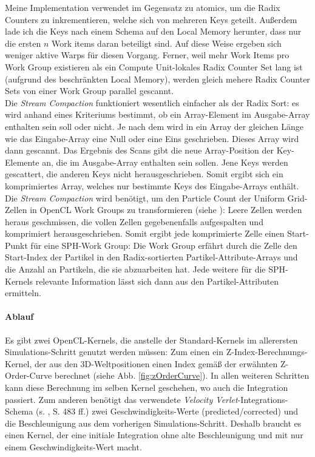 		Meine Implementation verwendet im Gegensatz zu \cite{Grand2008} atomics, um die Radix Counters
		zu inkrementieren, welche sich von mehreren Keys geteilt. Außerdem lade ich die Keys nach einem
		Schema auf den Local Memory herunter, dass nur die ersten $n$ Work items daran beteiligt sind.
		Auf diese Weise ergeben sich weniger aktive Warps für diesen Vorgang.
		Ferner, weil mehr Work Items pro Work Group existieren als ein Compute Unit-lokales
		Radix Counter Set lang ist (aufgrund des beschränkten Local Memory), werden gleich mehere
		Radix Counter Sets von einer Work Group parallel gescannt.\\
		
		
		Die \emph{Stream Compaction} funktioniert wesentlich einfacher als der Radix Sort:
		es wird anhand eines Kriteriums bestimmt, ob ein Array-Element im Ausgabe-Array enthalten sein soll oder nicht.
		Je nach dem wird in ein Array der gleichen Länge wie das Eingabe-Array eine Null oder eine Eins geschrieben.
		Dieses Array wird dann gescannt. Das Ergebnis des Scans gibt die neue Array-Position der
		Key-Elemente an, die im Ausgabe-Array enthalten sein sollen. Jene Keys werden gescattert, die anderen
		Keys nicht herausgeschrieben. Somit ergibt sich ein komprimiertes Array, welches nur bestimmte
		Keys des Eingabe-Arrays enthält.\\
		Die \emph{Stream Compaction} wird benötigt, um den Particle Count der Uniform Grid-Zellen
		in OpenCL Work Groups zu transformieren (siehe \cite{Goswami2010}):
		Leere Zellen werden heraus geschmissen, die vollen Zellen
		gegebenenfalls aufgespalten und komprimiert herausgeschrieben. Somit ergibt jede
		komprimierte Zelle einen Start-Punkt für eine SPH-Work Group: Die Work Group erfährt durch die Zelle
		den Start-Index der Partikel in den Radix-sortierten Partikel-Attribute-Arrays und die Anzahl an
		Partikeln, die sie abzuarbeiten hat. Jede weitere für die SPH-Kernels relevante Information
		lässt sich dann aus den Partikel-Attributen ermitteln.
		
		
		
		
	\paragraph{Ablauf}
		\label{sec:fluidSim:ablauf}
		
		Es gibt zwei OpenCL-Kernels, die anstelle der Standard-Kernels im allerersten Simulations-Schritt genutzt werden
		müssen: Zum einen ein Z-Index-Berechnungs-Kernel, der aus den 3D-Weltpositionen einen Index
		gemäß der erwähnten Z-Order-Curve berechnet (siehe Abb. \ref{fig:zOrderCurve}). 
		In allen weiteren Schritten kann diese Berechnung
		im selben Kernel geschehen, wo auch die Integration passiert.
		Zum anderen benötigt das verwendete \emph{Velocity Verlet}-Integrations-Schema 
		(s. \cite{Eberly2004}, S. 483 ff.) zwei Geschwindigkeits-Werte (predicted/corrected) und die Beschleunigung
		aus dem vorherigen Simulations-Schritt.
		Deshalb braucht es einen Kernel, der eine initiale Integration ohne alte Beschleunigung und mit nur einem
		Geschwindigkeits-Wert macht.
		
